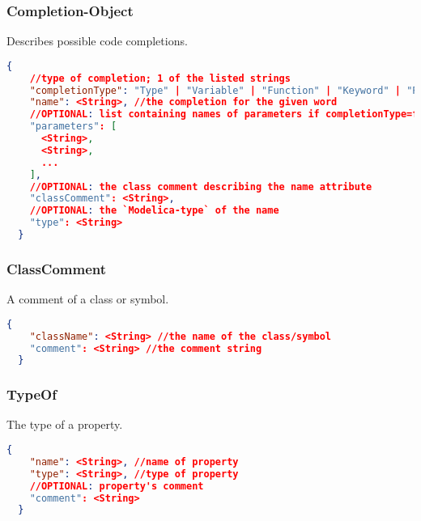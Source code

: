   \subsubsection{Completion-Object}
  Describes possible code completions.
  \newline{}
  \begin{lstlisting}[basicstyle=\small,language=json]
  {
    //type of completion; 1 of the listed strings
    "completionType": "Type" | "Variable" | "Function" | "Keyword" | "Package" | "Model" | "Class",
    "name": <String>, //the completion for the given word
    //OPTIONAL: list containing names of parameters if completionType=function
    "parameters": [
      <String>,
      <String>,
      ...
    ],
    //OPTIONAL: the class comment describing the name attribute
    "classComment": <String>,
    //OPTIONAL: the `Modelica-type` of the name
    "type": <String>
  }
  \end{lstlisting}

  \subsubsection{ClassComment}
  A comment of a class or symbol.
  \newline{}
  \begin{lstlisting}[basicstyle=\small,language=json]
  {
    "className": <String> //the name of the class/symbol
    "comment": <String> //the comment string
  }
  \end{lstlisting}

  \subsubsection{TypeOf}
  The type of a property.
  \newline{}
  \begin{lstlisting}[basicstyle=\small,language=json]
  {
    "name": <String>, //name of property
    "type": <String>, //type of property
    //OPTIONAL: property's comment
    "comment": <String>
  }
  \end{lstlisting}
